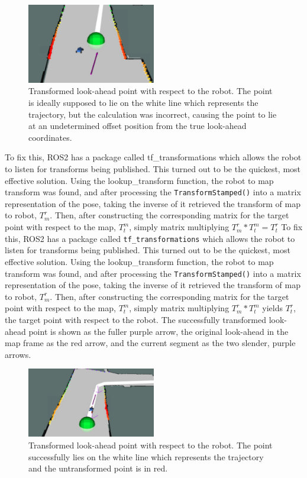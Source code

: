 \documentclass{article}
\begin{document}
\begin{figure}[htbp]
  \centering
  \includegraphics[width=0.5\textwidth]{failed_transform.png}
  \caption{Transformed look-ahead point with respect to the robot. The point is ideally supposed to lie on the white line which represents the trajectory, but the calculation was incorrect, causing the point to lie at an undetermined offset position from the true look-ahead coordinates.}
  \label{fig:failed_transform}
\end{figure}

To fix this, ROS2 has a package called tf\_transformations which allows the robot to listen for transforms being published. This turned out to be the quickest, most effective solution. Using the lookup\_transform function, the robot to map transform was found, and after processing the \texttt{TransformStamped()} into a matrix representation of the pose, taking the inverse of it retrieved the transform of map to robot, $T_m^r$. Then, after constructing the corresponding matrix for the target point with respect to the map, $T_t^m$, simply matrix multiplying $T_m^r*T_t^m=T_t^r$   
To fix this, ROS2 has a package called \texttt{tf\_transformations} which allows the robot to listen for transforms being published. This turned out to be the quickest, most effective solution. Using the lookup\_transform function, the robot to map transform was found, and after processing the \texttt{TransformStamped()} into a matrix representation of the pose, taking the inverse of it retrieved the transform of map to robot, $T_m^r$. Then, after constructing the corresponding matrix for the target point with respect to the map, $T_t^m$, simply matrix multiplying $T_m^r*T_t^m$ yields $T_t^r$, the target point with respect to the robot. The successfully transformed look-ahead point is shown as the fuller purple arrow, the original look-ahead in the map frame as the red arrow, and the current segment as the two slender, purple arrows.
\begin{figure}[htbp]
  \centering
  \includegraphics[width=0.5\textwidth]{successful_transform.png}
  \caption{Transformed look-ahead point with respect to the robot. The point successfully lies on the white line which represents the trajectory and the untransformed point is in red.}
  \label{fig:failed_transform}
\end{figure}
\end{document}
